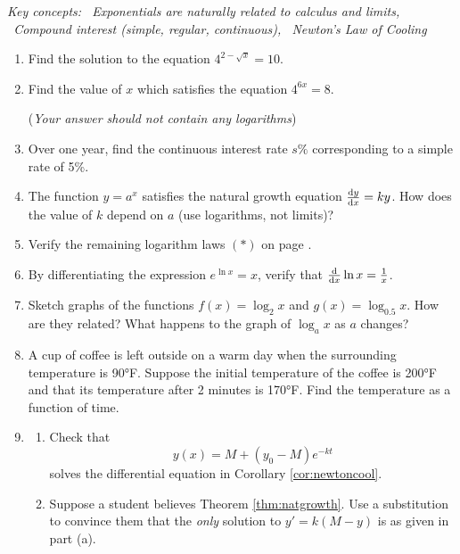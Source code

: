 \begin{exercises}{}{}
	\hangindent\leftmargini
	\emph{Key concepts: \ Exponentials are naturally related to calculus and limits, \ Compound interest (simple, regular, continuous), \ Newton's Law of Cooling}
	
	\begin{enumerate}
		\item Find the solution to the equation $4^{2-\sqrt x}=10$.
		
	  \item Find the value of $x$ which satisfies the equation $4^{6x}=8$.\par
	  (\emph{Your answer should not contain any logarithms})
	  
	  \item Over one year, find the continuous interest rate $s\%$ corresponding to a simple rate of 5\%.
	
	  \item The function $y=a^x$ satisfies the natural growth equation $\diff[y]x=ky$. How does the value of $k$ depend on $a$ (use logarithms, not limits)?
	  
		\item Verify the remaining logarithm laws $(\ast)$ on page \pageref{pg:loglaws}.
	
	  \item By differentiating the expression $e^{\ln x}=x$, verify that $\diff x\ln x=\frac 1x$.
	  
	  \item Sketch graphs of the functions $f(x)=\log_2x$ and $g(x)=\log_{0.5}x$. How are they related? What happens to the graph of $\log_ax$ as $a$ changes?
	  
	  
	  \item A cup of coffee is left outside on a warm day when the surrounding temperature is \ang{90}F. Suppose the initial temperature of the coffee is \ang{200}F and that its temperature after 2 minutes is \ang{170}F. Find the temperature as a function of time.
		
		
	  \item\begin{enumerate}
		  \item Check that
		  \[
		  	y(x)=M+(y_0-M)e^{-kt}
		  \]
		  solves the differential equation in Corollary \ref{cor:newtoncool}.
		  
		  \item Suppose a student believes Theorem \ref{thm:natgrowth}. Use a substitution to convince them that the \emph{only} solution to $y'=k(M-y)$ is as given in part (a).
		\end{enumerate}
		

\end{enumerate}
\end{exercises}
